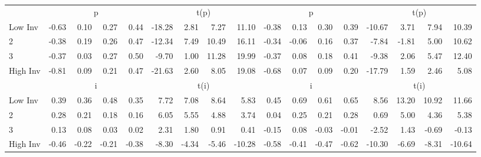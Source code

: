 \begin{table}[!ht]
\begin{tabular}{lrrrrrrrrrrrrrrrr}
  
    
      & \multicolumn{4}{c}{p} & \multicolumn{4}{c}{t(p)}
    
      & \multicolumn{4}{c}{p} & \multicolumn{4}{c}{t(p)}
    
    \\
      \cmidrule(r){2-5} \cmidrule(r){6-9} \cmidrule(r){10-13} \cmidrule(r){14-17}

    Low Inv   & -0.63  & 0.10  & 0.27  & 0.44  & -18.28  & 2.81  & 7.27  & 11.10  & -0.38  & 0.13  & 0.30  & 0.39  & -10.67  & 3.71  & 7.94  & 10.39  \\
           2  & -0.38  & 0.19  & 0.26  & 0.47  & -12.34  & 7.49  & 10.49  & 16.11  & -0.34  & -0.06  & 0.16  & 0.37  & -7.84  & -1.81  & 5.00  & 10.62  \\
           3  & -0.37  & 0.03  & 0.27  & 0.50  & -9.70  & 1.00  & 11.28  & 19.99  & -0.37  & 0.08  & 0.18  & 0.41  & -9.38  & 2.06  & 5.47  & 12.40  \\
    High Inv  & -0.81  & 0.09  & 0.21  & 0.47  & -21.63  & 2.60  & 8.05  & 19.08  & -0.68  & 0.07  & 0.09  & 0.20  & -17.79  & 1.59  & 2.46  & 5.08  \\

  
    
      & \multicolumn{4}{c}{i} & \multicolumn{4}{c}{t(i)}
    
      & \multicolumn{4}{c}{i} & \multicolumn{4}{c}{t(i)}
    
    \\
      \cmidrule(r){2-5} \cmidrule(r){6-9} \cmidrule(r){10-13} \cmidrule(r){14-17}

    Low Inv   & 0.39  & 0.36  & 0.48  & 0.35  & 7.72  & 7.08  & 8.64  & 5.83  & 0.45  & 0.69  & 0.61  & 0.65  & 8.56  & 13.20  & 10.92  & 11.66  \\
           2  & 0.28  & 0.21  & 0.18  & 0.16  & 6.05  & 5.55  & 4.88  & 3.74  & 0.04  & 0.25  & 0.21  & 0.28  & 0.69  & 5.00  & 4.36  & 5.38  \\
           3  & 0.13  & 0.08  & 0.03  & 0.02  & 2.31  & 1.80  & 0.91  & 0.41  & -0.15  & 0.08  & -0.03  & -0.01  & -2.52  & 1.43  & -0.69  & -0.13  \\
    High Inv  & -0.46  & -0.22  & -0.21  & -0.38  & -8.30  & -4.34  & -5.46  & -10.28  & -0.58  & -0.41  & -0.47  & -0.62  & -10.30  & -6.69  & -8.31  & -10.64  \\

  

  \bottomrule
\end{tabular}
\label{tbl:32_Size_OP_Inv_FF2015}
\end{table}